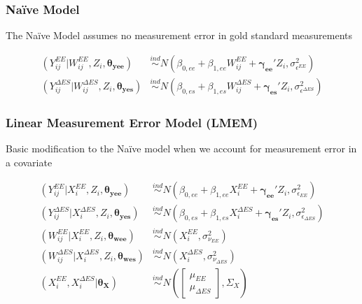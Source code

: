 \documentclass[handout]{beamer}\usepackage[]{graphicx}\usepackage[]{color}
\begin{document}
\begin{frame}
\frametitle{Na{\"i}ve Model}

The Na{\"i}ve Model assumes no measurement error in gold standard measurements %

\vspace{1cm}

\begin{align*}
  (Y_{ij}^{EE} | W_{ij}^{EE},Z_i,\boldsymbol{\theta_{yee}}) &\overset{ind}{\sim} N(\beta_{0,ee} + \beta_{1,ee}W_{ij}^{EE}+ \boldsymbol{\gamma_{ee}}'Z_i,\sigma_{\epsilon^{EE}}^2) \\
  (Y_{ij}^{\Delta ES} | W_{ij}^{\Delta ES},Z_i,\boldsymbol{\theta_{yes}}) &\overset{ind}{\sim} N(\beta_{0,es} + \beta_{1,es}W_{ij}^{\Delta ES}+ \boldsymbol{\gamma_{es}}'Z_i,\sigma_{\epsilon^{\Delta ES}}^2)
\end{align*}

\end{frame}


\begin{frame}
\frametitle{Linear Measurement Error Model (LMEM)}
Basic modification to the Na{\"i}ve model when we account for measurement error in a covariate

\begin{align*}
  (Y_{ij}^{EE}|X_i^{EE}, Z_i,\boldsymbol{\theta_{yee}}) &\overset{ind}{\sim} N(\beta_{0,ee} + \beta_{1,ee}X_i^{EE} + \boldsymbol{\gamma_{ee}}'Z_i, \sigma_{\epsilon_{EE}}^2) \\
  (Y_{ij}^{\Delta ES}|X_i^{\Delta ES}, Z_i,\boldsymbol{\theta_{yes}}) &\overset{ind}{\sim} N(\beta_{0,es} + \beta_{1,es}X_i^{\Delta ES} +  \boldsymbol{\gamma_{es}}'Z_i, \sigma_{\epsilon_{\Delta ES}}^2) \\
  (W_{ij}^{EE}|X_i^{EE}, Z_i,\boldsymbol{\theta_{wee}}) &\overset{ind}{\sim} N(X_i^{EE}, \sigma_{\nu_{EE}}^2 ) \\
  (W_{ij}^{\Delta ES}|X_i^{\Delta ES}, Z_i,\boldsymbol{\theta_{wes}}) &\overset{ind}{\sim} N(X_i^{\Delta ES}, \sigma_{\nu_{\Delta ES}}^2 )  \\
  (X_i^{EE},X_i^{\Delta ES}|\boldsymbol{\theta_X}) &\overset{ind}{\sim} N\left(
  \begin{bmatrix}
  \mu_{EE}\\
  \mu_{\Delta ES}
  \end{bmatrix}
  , \Sigma_X
  \right)
\end{align*}

\end{frame}
\end{document}
